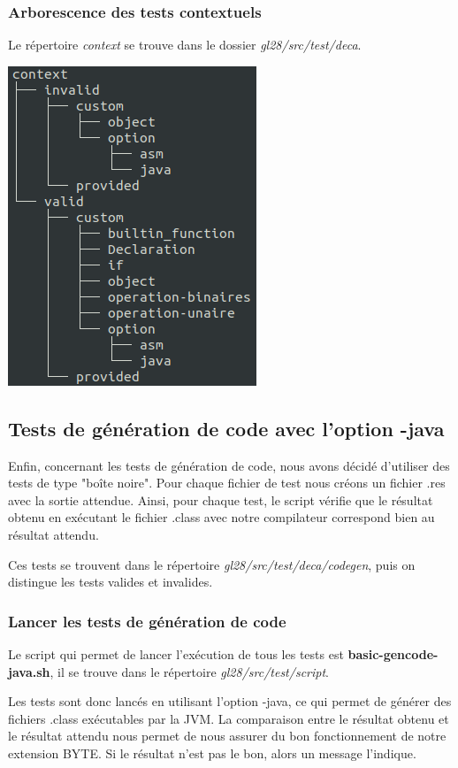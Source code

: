 \documentclass[12pt, a4paper, one side]{article}
\begin{document}
    \subsubsection{Arborescence des tests contextuels}
    Le répertoire \textit{context} se trouve dans le dossier \textit{gl28/src/test/deca}.
    \begin{center}
        \includegraphics[scale=0.7]{treecontext.png}
    \end{center}


    \subsection{Tests de génération de code avec l'option -java}
    Enfin, concernant les tests de génération de code, nous avons décidé d'utiliser des tests de type "boîte noire".
    Pour chaque fichier de test nous créons un fichier .res avec la sortie attendue. Ainsi, pour chaque test, le script vérifie
    que le résultat obtenu en exécutant le fichier .class avec notre compilateur correspond bien au résultat attendu.
    \begin{flushleft}
        Ces tests se trouvent dans le répertoire \textit{gl28/src/test/deca/codegen}, puis on distingue les tests valides et invalides.
    \end{flushleft}
    \subsubsection{Lancer les tests de génération de code}
    Le script qui permet de lancer l'exécution de tous les tests est \textbf{basic-gencode-java.sh}, il se trouve dans le répertoire \textit{gl28/src/test/script}.
    \begin{flushleft}Les tests sont donc lancés en utilisant l'option -java, ce qui permet de générer des fichiers .class
    exécutables par la JVM. La comparaison entre le résultat obtenu et le résultat attendu nous permet de nous assurer du bon
    fonctionnement de notre extension BYTE. Si le résultat n'est pas le bon, alors un message l'indique.
    \end{flushleft}
\end{document}
